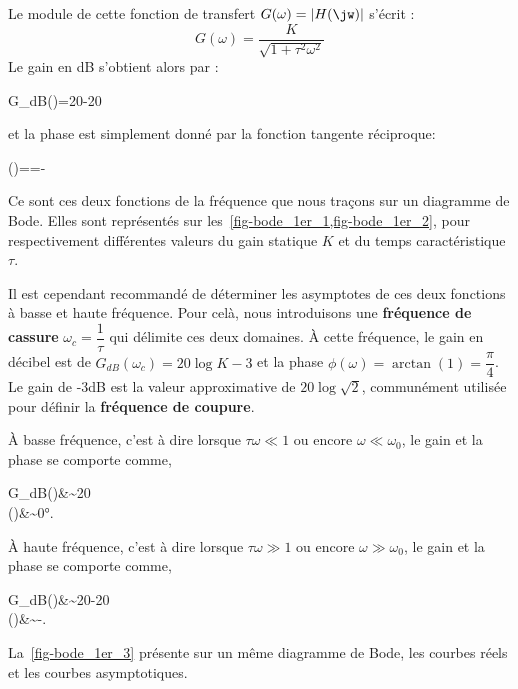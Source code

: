 Le module de cette fonction de transfert $G(\omega) =|H(\jw)|$ s'écrit :
$$G(\omega)=\dfrac{K}{\sqrt{1+\tau^2\omega^2}}$$
Le gain en dB s'obtient alors par :
\begin{bequation}
    G_{dB}(\omega)=20-20\label{eq-gain_1er}
\end{bequation}
et la phase est simplement donné par la fonction tangente réciproque:
\begin{bequation}
    \phi(\omega)==-\arctan{(\tau\omega)}\label{eq-phase_1er} 
\end{bequation}
Ce sont ces deux fonctions de la fréquence que nous traçons sur un diagramme
de Bode. Elles sont représentés sur les~\cref{fig-bode_1er_1,fig-bode_1er_2}, 
pour respectivement différentes valeurs du gain statique $K$ et du temps 
caractéristique $\tau$.
\newline

Il est cependant recommandé de déterminer les asymptotes 
de ces deux fonctions à basse et haute fréquence. 
Pour celà, nous introduisons une \textbf{fréquence de cassure} 
$\omega_c=\dfrac{1}{\tau}$ qui délimite ces deux domaines.
\`A cette fréquence, le gain en décibel est de $G_{dB}(\omega_c)=20\log{K}-3$ 
et la phase $\phi(\omega)=\arctan{(1)}=\dfrac{\pi}{4}$.
Le gain de -3dB est la valeur approximative de $20\log{\sqrt{2}}$, communément
utilisée pour définir la \textbf{fréquence de coupure}.

\`A basse fréquence, c'est à dire lorsque $\tau\omega\ll1$ ou 
encore $\omega\ll\omega_0$, le gain et la phase se comporte comme, 
\begin{bequation}
    G_{dB}(\omega)&\sim20 \\
    \phi(\omega)&\sim0\si{\degree}.
\end{bequation} 

\`A haute fréquence, c'est à dire lorsque $\tau\omega\gg1$ ou 
encore $\omega\gg\omega_0$, le gain et la phase se comporte comme,
\begin{bequation}
    G_{dB}(\omega)&\sim20-20 \\
    \phi(\omega)&\sim-.
\end{bequation} 
La~\cref{fig-bode_1er_3} présente sur un même diagramme de Bode, les courbes 
réels et les courbes asymptotiques.

